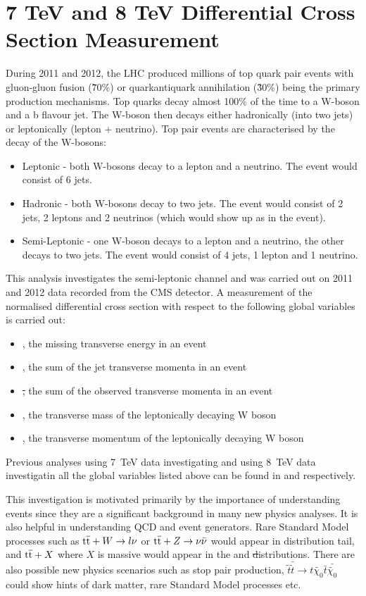 \chapter{7 TeV and 8 TeV Differential Cross Section Measurement}

During 2011 and 2012, the LHC produced millions of top quark pair events with gluon-gluon fusion (\~70\%) or
quark\-anti\-quark annihilation (\~30\%) being the primary production mechanisms. Top quarks decay almost
100\% of the time to a W-boson and a b flavour jet. The W-boson then decays either hadronically (into two
jets) or leptonically (lepton + neutrino). Top pair events are characterised by the decay of the W-bosons:
\begin{itemize}
  \item Leptonic - both W-bosons decay to a lepton and a neutrino. The event would consist of 6 jets.
  \item Hadronic - both W-bosons decay to two jets. The event would consist of 2 jets, 2 leptons and 2
  neutrinos (which would show up as \met in the event).
  \item Semi-Leptonic - one W-boson decays to a lepton and a neutrino, the other decays to two jets. The
  event would consist of 4 jets, 1 lepton and 1 neutrino.
\end{itemize}

This analysis investigates the semi-leptonic channel and was carried out on 2011 and 2012 data recorded from
the CMS detector. A measurement of the normalised differential \ttbar cross section with
respect to the following global variables is carried out:
\begin {itemize}
  \item {\met, the missing transverse energy in an event}
  \item {\HT, the sum of the jet transverse momenta in an event}
  \item {\st, the sum of the observed transverse momenta in an event}
  \item {\mt, the transverse mass of the leptonically decaying W boson}
  \item {\wpt, the transverse momentum of the leptonically decaying W boson}
\end{itemize}

Previous analyses using 7~TeV data investigating \met and using 8~TeV data investigatin all the global
variables listed above can be found in \cite{CMS-PAS-TOP-12-019} and \cite{CMS-PAS-TOP-12-042} respectively.

This investigation is motivated primarily by the importance of understanding \ttbar events since they are a
significant background in many new physics analyses. It is also helpful in understanding QCD and event
generators. Rare Standard Model processes such as $\mathrm{t}\overline{\mathrm{t}} + W\rightarrow l\nu$ or $\mathrm{t}\overline{\mathrm{t}} + Z\rightarrow
\nu\bar{\nu}$ would appear in \met distribution tail, and $\mathrm{t}\overline{\mathrm{t}} + X$ where $X$ is massive would appear in
the \HT and \st distributions. There are also possible new physics scenarios such as stop pair production,
$\tilde{t}\bar{\tilde{t}} \rightarrow t\tilde{\chi_0} \bar{t}\bar{\tilde{\chi_0}}$ could show hints of dark
matter, rare Standard Model processes etc.

